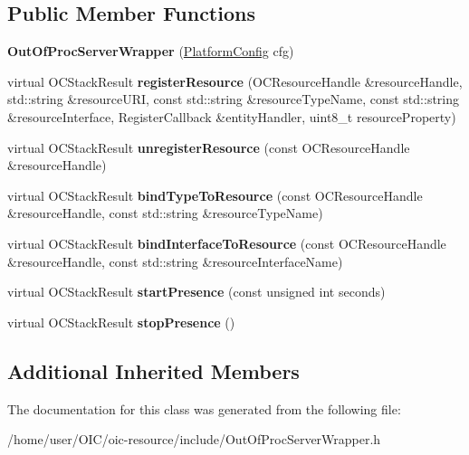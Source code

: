 \subsection*{Public Member Functions}
\begin{DoxyCompactItemize}
\item 
\hypertarget{classOC_1_1OutOfProcServerWrapper_aa0ca66b894b695679b8939fa7e4f2f69}{}{\bfseries Out\+Of\+Proc\+Server\+Wrapper} (\hyperlink{structOC_1_1PlatformConfig}{Platform\+Config} cfg)\label{classOC_1_1OutOfProcServerWrapper_aa0ca66b894b695679b8939fa7e4f2f69}

\item 
\hypertarget{classOC_1_1OutOfProcServerWrapper_a0c7ad538f0d7bad991899adead71f647}{}virtual O\+C\+Stack\+Result {\bfseries register\+Resource} (O\+C\+Resource\+Handle \&resource\+Handle, std\+::string \&resource\+U\+R\+I, const std\+::string \&resource\+Type\+Name, const std\+::string \&resource\+Interface, Register\+Callback \&entity\+Handler, uint8\+\_\+t resource\+Property)\label{classOC_1_1OutOfProcServerWrapper_a0c7ad538f0d7bad991899adead71f647}

\item 
\hypertarget{classOC_1_1OutOfProcServerWrapper_a861fee4fc14de26296f20cf89ccf7e6b}{}virtual O\+C\+Stack\+Result {\bfseries unregister\+Resource} (const O\+C\+Resource\+Handle \&resource\+Handle)\label{classOC_1_1OutOfProcServerWrapper_a861fee4fc14de26296f20cf89ccf7e6b}

\item 
\hypertarget{classOC_1_1OutOfProcServerWrapper_a4cf86674aab5df9f9073d93dd7cd0613}{}virtual O\+C\+Stack\+Result {\bfseries bind\+Type\+To\+Resource} (const O\+C\+Resource\+Handle \&resource\+Handle, const std\+::string \&resource\+Type\+Name)\label{classOC_1_1OutOfProcServerWrapper_a4cf86674aab5df9f9073d93dd7cd0613}

\item 
\hypertarget{classOC_1_1OutOfProcServerWrapper_aba73691be61c48b90ef829dc09a6ca67}{}virtual O\+C\+Stack\+Result {\bfseries bind\+Interface\+To\+Resource} (const O\+C\+Resource\+Handle \&resource\+Handle, const std\+::string \&resource\+Interface\+Name)\label{classOC_1_1OutOfProcServerWrapper_aba73691be61c48b90ef829dc09a6ca67}

\item 
\hypertarget{classOC_1_1OutOfProcServerWrapper_a2288984431b7d429c7795616496781ff}{}virtual O\+C\+Stack\+Result {\bfseries start\+Presence} (const unsigned int seconds)\label{classOC_1_1OutOfProcServerWrapper_a2288984431b7d429c7795616496781ff}

\item 
\hypertarget{classOC_1_1OutOfProcServerWrapper_afd686e2be1b82ec694cfbf8edda0599e}{}virtual O\+C\+Stack\+Result {\bfseries stop\+Presence} ()\label{classOC_1_1OutOfProcServerWrapper_afd686e2be1b82ec694cfbf8edda0599e}

\end{DoxyCompactItemize}
\subsection*{Additional Inherited Members}


The documentation for this class was generated from the following file\+:\begin{DoxyCompactItemize}
\item 
/home/user/\+O\+I\+C/oic-\/resource/include/Out\+Of\+Proc\+Server\+Wrapper.\+h\end{DoxyCompactItemize}
